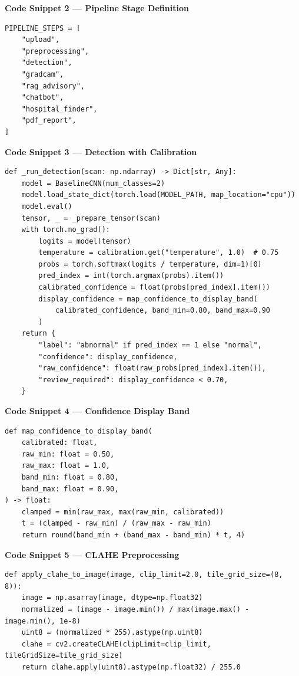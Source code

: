 \documentclass[11pt,a4paper]{article}
\begin{document}
\textbf{Code Snippet 2 --- Pipeline Stage Definition}

\begin{lstlisting}[style=python,caption={Eight-stage pipeline (\texttt{src/pipeline.py})}]
PIPELINE_STEPS = [
    "upload",
    "preprocessing",
    "detection",
    "gradcam",
    "rag_advisory",
    "chatbot",
    "hospital_finder",
    "pdf_report",
]
\end{lstlisting}

\textbf{Code Snippet 3 --- Detection with Calibration}

\begin{lstlisting}[style=python,caption={CNN inference with temperature scaling (\texttt{src/pipeline.py})}]
def _run_detection(scan: np.ndarray) -> Dict[str, Any]:
    model = BaselineCNN(num_classes=2)
    model.load_state_dict(torch.load(MODEL_PATH, map_location="cpu"))
    model.eval()
    tensor, _ = _prepare_tensor(scan)
    with torch.no_grad():
        logits = model(tensor)
        temperature = calibration.get("temperature", 1.0)  # 0.75
        probs = torch.softmax(logits / temperature, dim=1)[0]
        pred_index = int(torch.argmax(probs).item())
        calibrated_confidence = float(probs[pred_index].item())
        display_confidence = map_confidence_to_display_band(
            calibrated_confidence, band_min=0.80, band_max=0.90
        )
    return {
        "label": "abnormal" if pred_index == 1 else "normal",
        "confidence": display_confidence,
        "raw_confidence": float(raw_probs[pred_index].item()),
        "review_required": display_confidence < 0.70,
    }
\end{lstlisting}

\textbf{Code Snippet 4 --- Confidence Display Band}

\begin{lstlisting}[style=python,caption={Map confidence to 80--90\% display band (\texttt{src/pipeline.py})}]
def map_confidence_to_display_band(
    calibrated: float,
    raw_min: float = 0.50,
    raw_max: float = 1.0,
    band_min: float = 0.80,
    band_max: float = 0.90,
) -> float:
    clamped = min(raw_max, max(raw_min, calibrated))
    t = (clamped - raw_min) / (raw_max - raw_min)
    return round(band_min + (band_max - band_min) * t, 4)
\end{lstlisting}

\textbf{Code Snippet 5 --- CLAHE Preprocessing}

\begin{lstlisting}[style=python,caption={Contrast enhancement (\texttt{src/preprocessing.py})}]
def apply_clahe_to_image(image, clip_limit=2.0, tile_grid_size=(8, 8)):
    image = np.asarray(image, dtype=np.float32)
    normalized = (image - image.min()) / max(image.max() - image.min(), 1e-8)
    uint8 = (normalized * 255).astype(np.uint8)
    clahe = cv2.createCLAHE(clipLimit=clip_limit, tileGridSize=tile_grid_size)
    return clahe.apply(uint8).astype(np.float32) / 255.0
\end{lstlisting}
\end{document}
